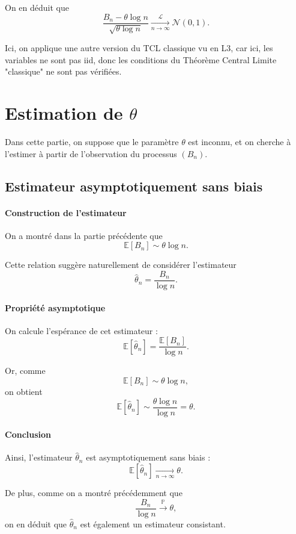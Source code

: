 \documentclass[12pt, a4paper]{article}
\theoremstyle{definition}
\theoremstyle{plain}
\begin{document}
On en déduit que
\[
\frac{B_n - \theta \log n}{\sqrt{\theta \log n}}
\xrightarrow[n \to \infty]{\mathcal{L}} \mathcal{N}(0,1).
\]

Ici, on applique une autre version du TCL classique vu en L3, car ici, les variables ne sont pas {iid}, donc les conditions du Théorème Central Limite "classique" ne sont pas vérifiées.

\section{Estimation de $\theta$}

Dans cette partie, on suppose que le paramètre $\theta$ est inconnu, et on cherche à l’estimer à partir de l’observation du processus $(B_n)$.

\subsection{Estimateur asymptotiquement sans biais}

\paragraph{Construction de l’estimateur}

On a montré dans la partie précédente que
\[
\mathbb{E}[B_n] \sim \theta \log n.
\]

Cette relation suggère naturellement de considérer l’estimateur
\[
\hat{\theta}_n = \frac{B_n}{\log n}.
\]

\paragraph{Propriété asymptotique}

On calcule l’espérance de cet estimateur :
\[
\mathbb{E}[\hat{\theta}_n]
= \frac{\mathbb{E}[B_n]}{\log n}.
\]

Or, comme
\[
\mathbb{E}[B_n] \sim \theta \log n,
\]
on obtient
\[
\mathbb{E}[\hat{\theta}_n]
\sim \frac{\theta \log n}{\log n}
= \theta.
\]

\paragraph{Conclusion}

Ainsi, l’estimateur $\hat{\theta}_n$ est asymptotiquement sans biais :
\[
\mathbb{E}[\hat{\theta}_n] \xrightarrow[n \to \infty]{} \theta.
\]

De plus, comme on a montré précédemment que
\[
\frac{B_n}{\log n} \xrightarrow{\mathbb{P}} \theta,
\]
on en déduit que $\hat{\theta}_n$ est également un estimateur consistant.
\end{document}
